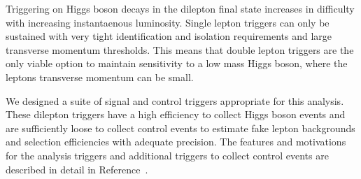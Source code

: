 Triggering on Higgs boson decays in the dilepton final state increases 
in difficulty with increasing instantaenous luminosity.
Single lepton triggers can only be sustained with very tight identification and
isolation requirements and large transverse momentum thresholds.
This means that double lepton triggers are the only viable option to maintain
sensitivity to a low mass Higgs boson, where the leptons transverse momentum
can be small.

We designed a suite of signal and control triggers appropriate for this analysis.
These dilepton triggers have a high efficiency to collect Higgs boson events
and are sufficiently loose to collect control events to estimate
fake lepton backgrounds and selection efficiencies with adequate precision.
The features and motivations for the analysis triggers and additional triggers to collect control events 
are described in detail in Reference~\cite{HWWICHEP2012}. 
